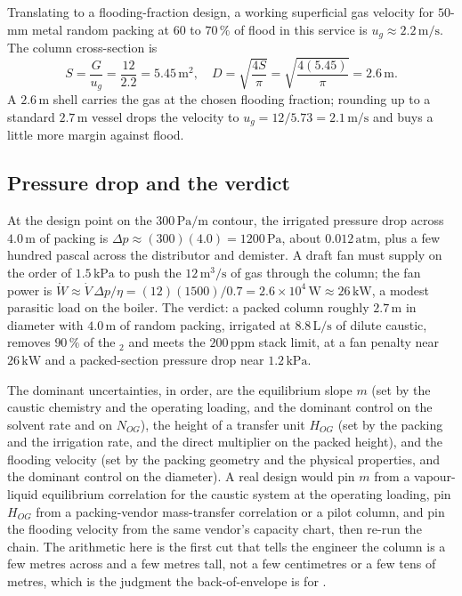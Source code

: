 

Translating to a flooding-fraction design, a
working superficial gas velocity for $50$-mm metal random packing at
$60$ to $70\,\%$ of flood in this service is $u_g \approx 2.2\,\text{m/s}$.
The column cross-section is
\[
S = \frac{G}{u_g} = \frac{12}{2.2} = 5.45\,\text{m}^2,
\quad D = \sqrt{\frac{4S}{\pi}} = \sqrt{\frac{4(5.45)}{\pi}} =
2.6\,\text{m}.
\]
A $2.6\,\text{m}$ shell carries the gas at the chosen flooding fraction;
rounding up to a standard $2.7\,\text{m}$ vessel drops the velocity to
$u_g = 12/5.73 = 2.1\,\text{m/s}$ and buys a little more margin against
flood.

\subsection{Pressure drop and the verdict}

At the design point on the $300\,\text{Pa/m}$ contour, the irrigated
pressure drop across $4.0\,\text{m}$ of packing is
$\Delta p \approx (300)(4.0) = 1200\,\text{Pa}$, about
$0.012\,\text{atm}$, plus a few hundred pascal across the distributor
and demister. A draft fan must supply on the order of $1.5\,\text{kPa}$
to push the $12\,\text{m}^3/\text{s}$ of gas through the column; the fan
power is $\dot W \approx \dot V\,\Delta p/\eta = (12)(1500)/0.7 =
2.6\times 10^{4}\,\text{W} \approx 26\,\text{kW}$, a modest parasitic
load on the boiler. The verdict: a packed column roughly $2.7\,\text{m}$
in diameter with $4.0\,\text{m}$ of random packing, irrigated at
$8.8\,\text{L/s}$ of dilute caustic, removes $90\,\%$ of the $_2$
and meets the $200\,\text{ppm}$ stack limit, at a fan penalty near
$26\,\text{kW}$ and a packed-section pressure drop near $1.2\,\text{kPa}$.

The dominant uncertainties, in order, are the equilibrium slope $m$ (set
by the caustic chemistry and the operating loading, and the dominant
control on the solvent rate and on $N_{OG}$), the height of a transfer
unit $H_{OG}$ (set by the packing and the irrigation rate, and the
direct multiplier on the packed height), and the flooding velocity (set
by the packing geometry and the physical properties, and the dominant
control on the diameter). A
real design would pin $m$ from a vapour-liquid equilibrium correlation
for the caustic system at the operating loading, pin $H_{OG}$ from a
packing-vendor mass-transfer correlation or a pilot column, and pin the
flooding velocity from the same vendor's capacity chart, then re-run the
chain. The arithmetic here is the first cut that tells the engineer the
column is a few metres across and a few metres tall, not a few
centimetres or a few tens of metres, which is the judgment the
back-of-envelope is for \cite{text:treybal-mass-transfer}.

